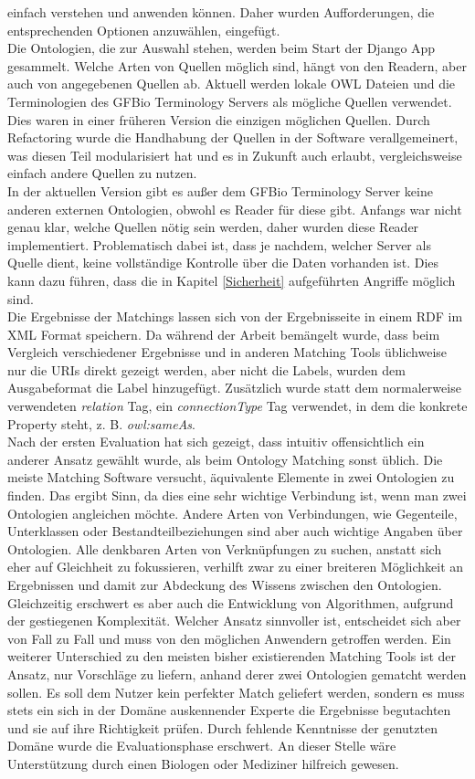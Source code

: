 einfach verstehen und anwenden können. Daher wurden Aufforderungen, die
entsprechenden Optionen anzuwählen, eingefügt.\\
Die Ontologien, die zur Auswahl stehen, werden beim Start der Django App
gesammelt. Welche Arten von Quellen möglich sind, hängt von den Readern, aber
auch von angegebenen Quellen ab. Aktuell werden lokale OWL Dateien und die
Terminologien des GFBio Terminology Servers als mögliche Quellen verwendet. Dies
waren in einer früheren Version die einzigen möglichen Quellen. Durch
Refactoring wurde die Handhabung der Quellen in der Software verallgemeinert,
was diesen Teil modularisiert hat und es in Zukunft auch erlaubt, vergleichsweise einfach andere
Quellen zu nutzen.\\
In der aktuellen Version gibt es außer dem GFBio Terminology Server keine
anderen externen Ontologien, obwohl es Reader für diese gibt. Anfangs war
nicht genau klar, welche Quellen nötig sein werden, daher wurden diese Reader
implementiert. Problematisch dabei ist, dass je nachdem, welcher Server als
Quelle dient, keine vollständige Kontrolle über die Daten vorhanden ist. Dies
kann dazu führen, dass die in Kapitel \ref{Sicherheit} aufgeführten Angriffe
möglich sind.\\
Die Ergebnisse der Matchings lassen sich von der Ergebnisseite in einem RDF
im XML Format speichern. Da während der Arbeit bemängelt wurde, dass beim
Vergleich verschiedener Ergebnisse und in anderen Matching Tools üblichweise nur
die URIs direkt gezeigt werden, aber nicht die Labels, wurden dem Ausgabeformat
die Label hinzugefügt. Zusätzlich wurde statt dem normalerweise verwendeten
\textit{relation} Tag, ein \textit{connectionType} Tag verwendet, in dem die
konkrete Property steht, z. B. \textit{owl:sameAs}.\\
Nach der ersten Evaluation hat sich gezeigt, dass intuitiv offensichtlich ein
anderer Ansatz gewählt wurde, als beim Ontology Matching sonst üblich. Die
meiste Matching Software versucht, äquivalente Elemente in zwei Ontologien zu
finden. Das ergibt Sinn, da dies eine sehr wichtige Verbindung ist, wenn man
zwei Ontologien angleichen möchte. Andere Arten von Verbindungen, wie
Gegenteile, Unterklassen oder Bestandteilbeziehungen sind aber auch wichtige
Angaben über Ontologien. Alle denkbaren Arten von Verknüpfungen zu suchen,
anstatt sich eher auf Gleichheit zu fokussieren, verhilft zwar zu einer
breiteren Möglichkeit an Ergebnissen und damit zur Abdeckung des Wissens
zwischen den Ontologien. Gleichzeitig erschwert es aber auch die Entwicklung von
Algorithmen, aufgrund der gestiegenen Komplexität. Welcher Ansatz sinnvoller
ist, entscheidet sich aber von Fall zu Fall und muss von den möglichen Anwendern
getroffen werden. Ein weiterer Unterschied zu den meisten bisher existierenden
Matching Tools ist der Ansatz, nur Vorschläge zu liefern, anhand derer zwei
Ontologien gematcht werden sollen. Es soll dem Nutzer kein perfekter Match
geliefert werden, sondern es muss stets ein sich in der Domäne auskennender
Experte die Ergebnisse begutachten und sie auf ihre Richtigkeit prüfen. Durch
fehlende Kenntnisse der genutzten Domäne wurde die Evaluationsphase erschwert.
An dieser Stelle wäre Unterstützung durch einen Biologen oder Mediziner
hilfreich gewesen.

